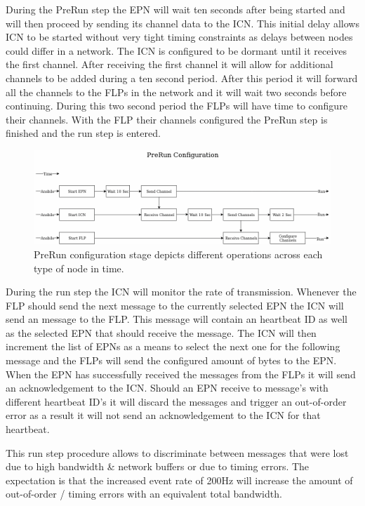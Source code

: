 \documentclass[]{article}
\begin{document}
During the PreRun step the EPN will wait ten seconds after being started and will then proceed by sending its channel data to the ICN. This initial delay allows ICN to be started without very tight timing constraints as delays between nodes could differ in a network. The ICN is configured to be dormant until it receives the first channel. After receiving the first channel it will allow for additional channels to be added during a ten second period. After this period it will forward all the channels to the FLPs in the network and it will wait two seconds before continuing. During this two second period the FLPs will have time to configure their channels. With the FLP their channels configured the PreRun step is finished and the run step is entered.

\begin{center}
	\begin{figure}[H]
		\includegraphics[width=\textwidth]{images/no-zookeeper-flow}
		\caption{PreRun configuration stage depicts different operations across each type of node in time.}
		\label{fig:ssh}
	\end{figure}
\end{center}

During the run step the ICN will monitor the rate of transmission. Whenever the FLP should send the next message to the currently selected EPN the ICN will send an message to the FLP. This message will contain an heartbeat ID as well as the selected EPN that should receive the message. The ICN will then increment the list of EPNs as a means to select the next one for the following message and the FLPs will send the configured amount of bytes to the EPN. When the EPN has successfully received the messages from the FLPs it will send an acknowledgement to the ICN. Should an EPN receive to message’s with different heartbeat ID’s it will discard the messages and trigger an out-of-order error as a result it will not send an acknowledgement to the ICN for that heartbeat.

This run step procedure allows to discriminate between messages that were lost due to high bandwidth \& network buffers or due to timing errors. The expectation is that the increased event rate of 200Hz will increase the amount of out-of-order / timing errors with an equivalent total bandwidth.
\end{document}
